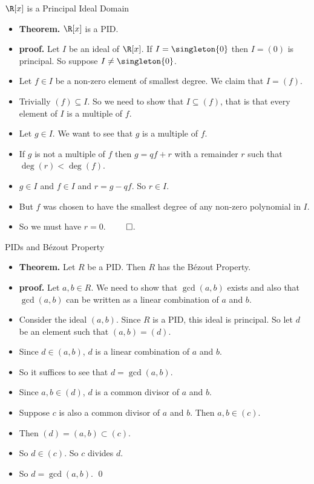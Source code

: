 \documentclass[handout]{beamer}
\begin{document}
\begin{frame}{$\R[x]$ is a Principal Ideal Domain}

\begin{itemize}
  \item \textbf{Theorem.} $\R[x]$ is a PID.
  \item \textbf{proof.} Let $I$ be an ideal of $\R[x]$. If $I = \singleton{0}$ then $I=(0)$ is principal. So suppose $I\not=\singleton{0}$.
  \item Let $f\in I$ be a non-zero element of smallest degree. We claim that $I=(f)$.
  \item Trivially $(f) \subseteq I$. So we need to show that $I \subseteq (f)$, that is that every element of $I$ is a multiple of $f$.
  \item Let $g\in I$. We want to see that $g$ is a multiple of $f$.
  \item If $g$ is not a multiple of $f$ then $g=qf+r$ with a remainder $r$ such that $\deg(r) < \deg(f)$.
  \item $g\in I$ and $f\in I$ and $r=g-qf$. So $r\in I$.
  \item But $f$ was chosen to have the smallest degree of any non-zero polynomial in $I$.
  \item So we must have $r=0$. $\qed$.
\end{itemize}

\end{frame}



\begin{frame}{PIDs and B\'{e}zout Property}

\begin{itemize}
  \item \textbf{Theorem.} Let $R$ be a PID. Then $R$ has the B\'{e}zout Property.
  \item \textbf{proof.}  Let $a,b\in R$. We need to show that $\gcd(a,b)$ exists and also that $\gcd(a,b)$
  can be written as a linear combination of $a$ and $b$.
  \item Consider the ideal $(a,b)$. Since $R$ is a PID, this ideal is principal. So let $d$ be an element
  such that $(a,b) = (d)$.
  \item Since $d\in(a,b)$, $d$ is a linear combination of $a$ and $b$.
  \item So it suffices to see that $d=\gcd(a,b)$.
  \item Since $a,b \in (d)$, $d$ is a common divisor of $a$ and $b$.
  \item Suppose $c$ is also a common divisor of $a$ and $b$. Then $a,b\in (c)$.
  \item Then $(d) = (a,b) \subset (c)$.
  \item So $d\in (c)$. So $c$ divides $d$.
  \item So $d=\gcd(a,b)$. \qed
\end{itemize}

\end{frame}
\end{document}
